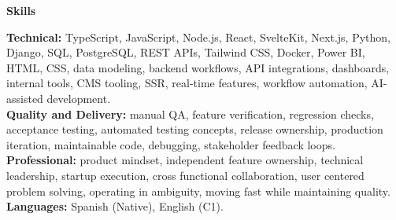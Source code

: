 \documentclass[11pt]{article}
\begin{document}
\vspace{7pt}
\begin{center}
    \textbf{Skills}
\end{center}
\vspace{-4pt}
\textbf{Technical:} TypeScript, JavaScript, Node.js, React, SvelteKit, Next.js, Python, Django, SQL, PostgreSQL, REST APIs, Tailwind CSS, Docker, Power BI, HTML, CSS, data modeling, backend workflows, API integrations, dashboards, internal tools, CMS tooling, SSR, real-time features, workflow automation, AI-assisted development. \\
\textbf{Quality and Delivery:} manual QA, feature verification, regression checks, acceptance testing, automated testing concepts, release ownership, production iteration, maintainable code, debugging, stakeholder feedback loops. \\
\textbf{Professional:} product mindset, independent feature ownership, technical leadership, startup execution, cross functional collaboration, user centered problem solving, operating in ambiguity, moving fast while maintaining quality. \\
\textbf{Languages:} Spanish (Native), English (C1).
\end{document}
